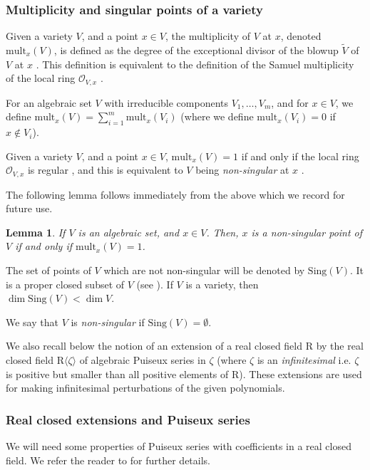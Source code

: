 \documentclass[10pt]{amsart}
\newtheorem{lemma}{Lemma}[section]
\theoremstyle{definition}
\theoremstyle{remark}
\numberwithin{equation}{section}
\newcommand {\R} {\mathrm{R}}
\newcommand {\la}   {{\langle}}
\newcommand {\ra}   {{\rangle}}
\newcommand{\Sing}{\mathrm{Sing}}
\newcommand{\mult}{\mathrm{mult}}
\begin{document}
\subsubsection{Multiplicity and singular points of a variety}
\label{subsubsec:mult}
Given a variety $V$, and a point $x \in V$,
the multiplicity of $V$ at $x$, denoted $\mult_x(V)$,  
is defined as the degree
of the exceptional divisor of the blowup $\widetilde{V}$ of $V$ at $x$ 
\cite[Section 4.3, page 79]{Fulton}. This definition is equivalent to the definition of the Samuel multiplicity of the local ring $\mathcal{O}_{V,x}$ \cite[Example 4.3.1]{Fulton}.

For an algebraic set $V$ with irreducible components $V_1,\ldots,V_m$,
and for $x \in V$, we define
$\mult_x(V) = \sum_{i=1}^{m} \mult_x(V_i)$ (where we define
$\mult_x(V_i) = 0$ if $x \not\in V_i$). 

Given a variety $V$,
and a point $x \in V$,
$\mult_x(V) = 1$ if and only if the local ring
$\mathcal{O}_{V,x}$ is regular \cite[Example 4.3.5 (d)]{Fulton}, and
this is equivalent to $V$ being \emph{non-singular} at $x$
\cite[Section B.2.7, Page 429]{Fulton}.


The following lemma follows immediately from the above which we record for future use.

\begin{lemma}
\label{lem:singular}
If $V$ is an algebraic set, and $x \in V$. Then, $x$ is a non-singular point of $V$ if and only if $\mult_x(V) = 1$.
\end{lemma}

The set of points of $V$ which are not non-singular will be denoted by
$\Sing(V)$. It is a proper closed subset of $V$ (see \cite[Theorem 5.3]{Hartshorne}).
If $V$ is a variety, then $\dim \Sing(V) < \dim V$.

We say that $V$ is \emph{non-singular}  if $\Sing(V) = \emptyset$.


We also recall below  the notion of an extension of a real closed field $\R$ by the real closed field $\R\la\zeta\ra$ of algebraic Puiseux series in $\zeta$ (where $\zeta$ is an \emph{infinitesimal} i.e. $\zeta $ is positive but smaller than all positive elements of $\R$). These extensions are used for making infinitesimal perturbations of the given polynomials. 


\subsubsection{Real closed extensions and Puiseux series}
\label{subsubsec:Puiseux}
We will need some
properties of Puiseux series with coefficients in a real closed field. We
refer the reader to \cite{BPRbook2} for further details.
\end{document}
